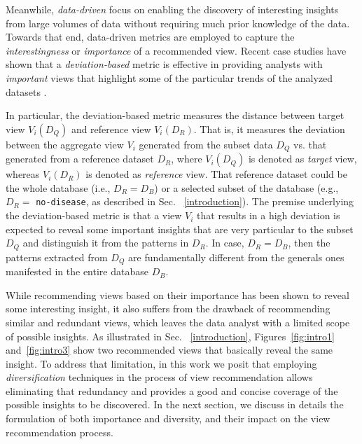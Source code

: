 Meanwhile, {\em data-driven} focus on enabling the discovery of interesting insights from large volumes of data without requiring much prior knowledge of the data.
%
Towards that end, data-driven metrics are employed to capture the {\em interestingness} or {\em importance} of a recommended view. 
%
Recent case studies have shown that a {\em deviation-based} metric is effective in providing analysts with {\em important} views that highlight some of the particular trends of the analyzed datasets \cite{Vartak2015, Vartak2014, TKDEHumaira, Ehsan2016}.

%

%
In particular, the deviation-based metric measures the distance between target view $V_i(D_Q)$ and reference view $V_i(D_R)$. 
%
That is, it measures the deviation between the aggregate view $V_i$ generated from the subset data $D_Q$ vs. that generated from a reference dataset $D_R$, where $V_i(D_Q)$ is denoted as {\em target} view, whereas $V_i(D_R)$ is denoted as {\em reference} view. 
%
That reference dataset could be the whole database (i.e., $D_R=D_B$) or a selected subset of the database (e.g., $D_R=$ {\tt no-disease}, as described in Sec. ~\ref{introduction}). 
%
%
The premise underlying the deviation-based metric is that a view $V_i$ that results in a high deviation is expected to reveal some important insights that are very particular to the subset $D_Q$ and distinguish it from the patterns in $D_R$.
%
In case, $D_R=D_B$, then the patterns extracted from $D_Q$ are fundamentally different from the generals ones manifested in the entire database $D_B$.  

While recommending views based on their importance has been shown to reveal some interesting insight, it also suffers from the drawback of recommending similar and redundant views, which leaves the data analyst with a limited scope of possible insights.    
As illustrated in Sec. ~\ref{introduction}, Figures~\ref{fig:intro1} and~\ref{fig:intro3} show two recommended views that basically reveal the same insight.  
%
To address that limitation, in this work we posit that employing {\em diversification} techniques \cite{Clarke2008,Drosou,Rafiei2010,Vieira2011,Zhang2008,Khan2015,DBLP:conf/sigmod/HussainKS15} in the process of view recommendation allows eliminating that redundancy and provides a good and concise coverage of the possible insights to be discovered.
In the next section, we discuss in details the formulation of both importance and diversity, and their impact on the view recommendation process.
%

























